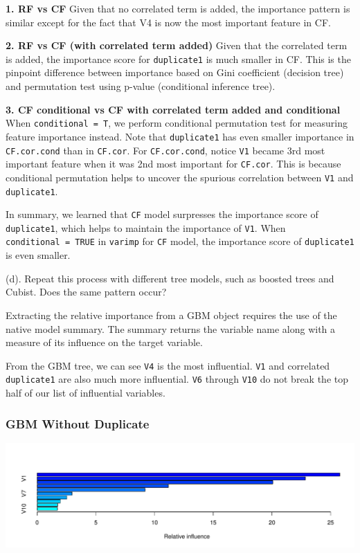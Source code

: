 \documentclass[]{report}
\begin{document}
\textbf{1. RF vs CF } Given that no correlated term is added, the
importance pattern is similar except for the fact that V4 is now the
most important feature in CF.

\textbf{2. RF vs CF (with correlated term added)} Given that the
correlated term is added, the importance score for \texttt{duplicate1}
is much smaller in CF. This is the pinpoint difference between
importance based on Gini coefficient (decision tree) and permutation
test using p-value (conditional inference tree).

\textbf{3. CF conditional vs CF with correlated term added and
conditional} When \texttt{conditional\ =\ T}, we perform conditional
permutation test for measuring feature importance instead. Note that
\texttt{duplicate1} has even smaller importance in \texttt{CF.cor.cond}
than in \texttt{CF.cor}. For \texttt{CF.cor.cond}, notice \texttt{V1}
became 3rd most important feature when it was 2nd most important for
\texttt{CF.cor}. This is because conditional permutation helps to
uncover the spurious correlation between \texttt{V1} and
\texttt{duplicate1}.

In summary, we learned that \texttt{CF} model surpresses the importance
score of \texttt{duplicate1}, which helps to maintain the importance of
\texttt{V1}. When \texttt{conditional\ =\ TRUE} in \texttt{varimp} for
\texttt{CF} model, the importance score of \texttt{duplicate1} is even
smaller.

\begin{subquestion}{(d).} Repeat this process with different tree models, such as boosted trees and Cubist. Does the same pattern occur?\end{subquestion}

Extracting the relative importance from a GBM object requires the use of
the native model summary. The summary returns the variable name along
with a measure of its influence on the target variable.

From the GBM tree, we can see \texttt{V4} is the most influential.
\texttt{V1} and correlated \texttt{duplicate1} are also much more
influential. \texttt{V6} through \texttt{V10} do not break the top half
of our list of influential variables.

\subsubsection{GBM Without Duplicate}\label{gbm-without-duplicate}

\includegraphics{Homework-Two2_files/figure-latex/kj-8.1d-1.pdf}
\end{document}
